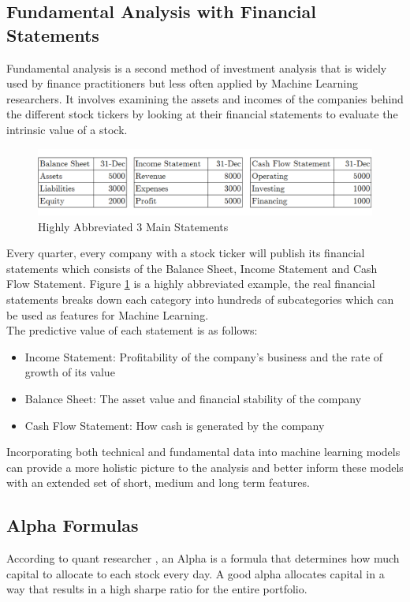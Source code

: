 \documentclass[a4paper,12pt]{report}
\numberwithin{equation}{section}
\theoremstyle{definition}
\begin{document}
\subsection{Fundamental Analysis with Financial Statements}
Fundamental analysis is a second method of investment analysis that is widely used by finance practitioners but less often applied by Machine Learning researchers. It involves examining the assets and incomes of the companies behind the different stock tickers by looking at their financial statements to evaluate the intrinsic value of a stock. 
\begin{figure}[H]
  \centerline{\includegraphics[width=17cm]{financial_statements}}
  \caption{Highly Abbreviated 3 Main Statements}
  \label{fig:financial statements}
\end{figure}
Every quarter, every company with a stock ticker will publish its financial statements which consists of the Balance Sheet, Income Statement and Cash Flow Statement. Figure \ref{fig:financial statements} is a highly abbreviated example, the real financial statements breaks down each category into hundreds of subcategories which can be used as features for Machine Learning.\\

The predictive value of each statement is as follows:
\begin{itemize}
  \item {Income Statement: Profitability of the company's business and the rate of growth of its value}
  \item {Balance Sheet: The asset value and financial stability of the company }
  \item {Cash Flow Statement: How cash is generated by the company}
\end{itemize}

Incorporating both technical and fundamental data into machine learning models can provide a more holistic picture to the analysis and better inform these models with an extended set of short, medium and long term features.

\subsection{Alpha Formulas}
According to quant researcher \cite{tulchinsky_finding_2019}, an Alpha is a formula that determines how much capital to allocate to each stock every day. A good alpha allocates capital in a way that results in a high sharpe ratio for the entire portfolio.\\
\end{document}
